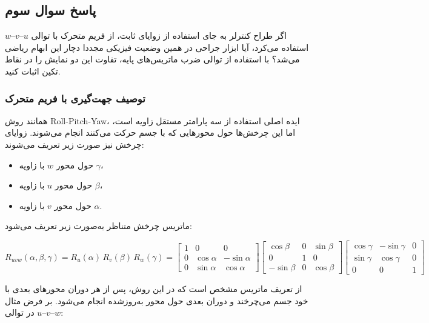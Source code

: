 \documentclass{article}
\begin{document}
\subsection{پاسخ سوال سوم}

اگر طراح کنترلر به جای استفاده از زوایای ثابت، از فریم متحرک  با توالی $u$--$v$--$w$ استفاده می‌کرد، آیا ابزار جراحی در همین وضعیت فیزیکی مجددا دچار این ابهام ریاضی می‌شد؟ با استفاده از توالی ضرب ماتریس‌های پایه، تفاوت این دو نمایش را در نقاط تکین اثبات کنید.

\subsubsection{توصیف جهت‌گیری با فریم متحرک }

همانند روش Roll-Pitch-Yaw، ایده اصلی استفاده از سه پارامتر مستقل زاویه است، اما این چرخش‌ها حول محورهایی که با جسم حرکت می‌کنند انجام می‌شوند. زوایای چرخش نیز صورت زیر تعریف می‌شوند: 

\begin{itemize}
	\item  حول محور $w$ با زاویه $\gamma$،
	\item  حول محور $u$ با زاویه $\beta$،
	\item  حول محور $v$ با زاویه $\alpha$.
\end{itemize}

ماتریس چرخش متناظر  به‌صورت زیر تعریف می‌شود: 

\[
R_{uvw}(\alpha,\beta,\gamma)
= R_{u}(\alpha)\, R_{v}(\beta)\, R_{w}(\gamma)
= 
\begin{bmatrix}
	1 & 0 & 0 \\
	0 & \cos\alpha & -\sin\alpha \\
	0 & \sin\alpha & \cos\alpha
\end{bmatrix} 
\begin{bmatrix}
	\cos\beta & 0 & \sin\beta \\
	0 & 1 & 0 \\
	-\sin\beta & 0 & \cos\beta
\end{bmatrix} 
\begin{bmatrix}
	\cos\gamma & -\sin\gamma & 0 \\
	\sin\gamma & \cos\gamma & 0 \\
	0 & 0 & 1
\end{bmatrix}
\]

از تعریف ماتریس مشخص است که در این روش، پس از هر دوران محورهای بعدی با خود جسم می‌چرخند و دوران بعدی حول محور به‌روزشده انجام می‌شود. بر فرض مثال در توالی $u$--$v$--$w$:
\end{document}
